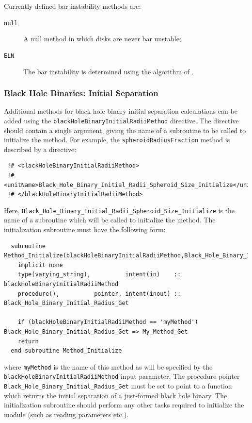 Currently defined bar instability methods are:
\begin{description}
 \item [{\tt null}] A null method in which disks are never bar unstable;
 \item [{\tt ELN}] The bar instability is determined using the algorithm of \cite{efstathiou_stability_1982}.
\end{description}

\subsubsection{Black Hole Binaries: Initial Separation}

Additional methods for black hole binary initial separation calculations can be added using the {\tt blackHoleBinaryInitialRadiiMethod} directive. The directive should contain a single argument, giving the name of a subroutine to be called to initialize the method. For example, the {\tt spheroidRadiusFraction} method is described by a directive:
\begin{verbatim}
 !# <blackHoleBinaryInitialRadiiMethod>
 !#  <unitName>Black_Hole_Binary_Initial_Radii_Spheroid_Size_Initialize</unitName>
 !# </blackHoleBinaryInitialRadiiMethod>
\end{verbatim}
Here, {\tt Black\_Hole\_Binary\_Initial\_Radii\_Spheroid\_Size\_Initialize} is the name of a subroutine which will be called to initialize the method. The initialization subroutine must have the following form:
\begin{verbatim}
  subroutine Method_Initialize(blackHoleBinaryInitialRadiiMethod,Black_Hole_Binary_Initial_Radius_Get)
    implicit none
    type(varying_string),          intent(in)    :: blackHoleBinaryInitialRadiiMethod
    procedure(),          pointer, intent(inout) :: Black_Hole_Binary_Initial_Radius_Get
    
    if (blackHoleBinaryInitialRadiiMethod == 'myMethod') Black_Hole_Binary_Initial_Radius_Get => My_Method_Get
    return
  end subroutine Method_Initialize
\end{verbatim}
where {\tt myMethod} is the name of this method as will be specified by the {\tt blackHoleBinaryInitialRadiiMethod} input parameter. The procedure pointer {\tt Black\_Hole\_Binary\_Initial\_Radius\_Get} must be set to point to a function which returns the initial separation of a just-formed black hole binary. The initialization subroutine should perform any other tasks required to initialize the module (such as reading parameters etc.).

